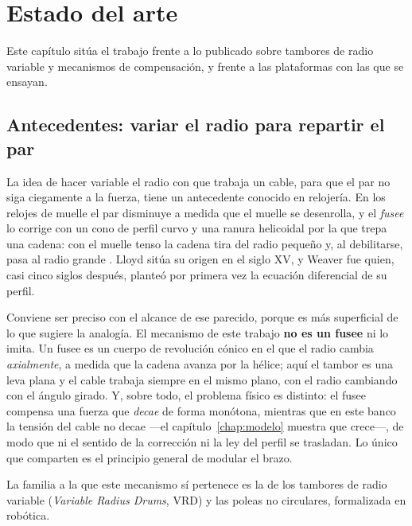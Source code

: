 \chapter{Estado del arte}
\label{chap:estado}

Este capítulo sitúa el trabajo frente a lo publicado sobre tambores de radio variable y mecanismos
de compensación, y frente a las plataformas con las que se ensayan.

\section{Antecedentes: variar el radio para repartir el par}

La idea de hacer variable el radio con que trabaja un cable, para que el par no siga ciegamente a la
fuerza, tiene un antecedente conocido en relojería. En los relojes de muelle el par disminuye a
medida que el muelle se desenrolla, y el \emph{fusee} lo corrige con un cono de perfil curvo y una
ranura helicoidal por la que trepa una cadena: con el muelle tenso la cadena tira del radio pequeño
y, al debilitarse, pasa al radio grande \cite{landes1983}. Lloyd \cite{lloyd1951} sitúa su origen en
el siglo XV, y Weaver \cite{weaver1980} fue quien, casi cinco siglos después, planteó por primera vez
la ecuación diferencial de su perfil.

Conviene ser preciso con el alcance de ese parecido, porque es más superficial de lo que sugiere la
analogía. El mecanismo de este trabajo \textbf{no es un fusee} ni lo imita. Un fusee es un cuerpo de
revolución cónico en el que el radio cambia \emph{axialmente}, a medida que la cadena avanza por la
hélice; aquí el tambor es una leva plana y el cable trabaja siempre en el mismo plano, con el radio
cambiando con el ángulo girado. Y, sobre todo, el problema físico es distinto: el fusee compensa una
fuerza que \emph{decae} de forma monótona, mientras que en este banco la tensión del cable no decae
---el capítulo~\ref{chap:modelo} muestra que crece---, de modo que ni el sentido de la corrección ni
la ley del perfil se trasladan. Lo único que comparten es el principio general de modular el brazo.

La familia a la que este mecanismo sí pertenece es la de los tambores de radio variable
(\emph{Variable Radius Drums}, VRD) y las poleas no circulares, formalizada en robótica.

